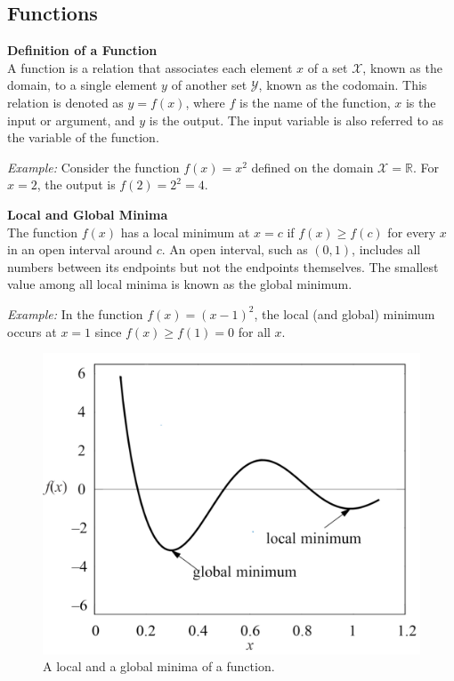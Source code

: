 \subsection{Functions}

\textbf{Definition of a Function}\\
A function is a relation that associates each element \( x \) of a set \( \mathcal{X} \), known as the domain, to a single element \( y \) of another set \( \mathcal{Y} \), known as the codomain. This relation is denoted as \( y = f(x) \), where \( f \) is the name of the function, \( x \) is the input or argument, and \( y \) is the output. The input variable is also referred to as the variable of the function.

\emph{Example:} Consider the function \( f(x) = x^2 \) defined on the domain \( \mathcal{X} = \mathbb{R} \). For \( x = 2 \), the output is \( f(2) = 2^2 = 4 \).

\textbf{Local and Global Minima}\\
The function \( f(x) \) has a local minimum at \( x = c \) if \( f(x) \geq f(c) \) for every \( x \) in an open interval around \( c \). An open interval, such as \( (0,1) \), includes all numbers between its endpoints but not the endpoints themselves. The smallest value among all local minima is known as the global minimum.

\emph{Example:} In the function \( f(x) = (x-1)^2 \), the local (and global) minimum occurs at \( x = 1 \) since \( f(x) \geq f(1) = 0 \) for all \( x \).

\begin{figure}[H]
	\centering
	\includegraphics[width=0.7\linewidth]{imgs/notation/notation_3.png}
	\caption{A local and a global minima of a function.}
	\label{fig:notation_3}
\end{figure}

